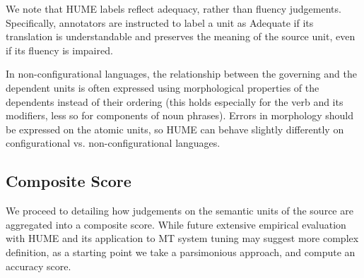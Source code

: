 \documentclass[11pt]{article}
\newcommand{\figref}[1]{Figure~\ref{#1}}
\begin{document}
We note that HUME labels reflect adequacy, rather than fluency judgements.
Specifically, annotators are instructed to
label a unit as Adequate if its translation is understandable and preserves
the meaning of the source unit, even if its fluency is impaired.

In non-configurational languages, the relationship between the
governing and the dependent units is often expressed using morphological
properties of the dependents instead of their ordering
(this holds especially for the verb and its modifiers,
less so for components of noun phrases). Errors in morphology
should be expressed on the atomic units, so HUME can behave slightly differently
on configurational vs. non-configurational languages.




\subsection{Composite Score}\label{sec:score}

We proceed to detailing how judgements on the semantic units
of the source are aggregated into a composite score.
While future extensive empirical evaluation with HUME and its application to MT
system tuning may suggest more complex definition,
as a starting point we take a parsimonious approach,
and compute an accuracy score.
\end{document}
